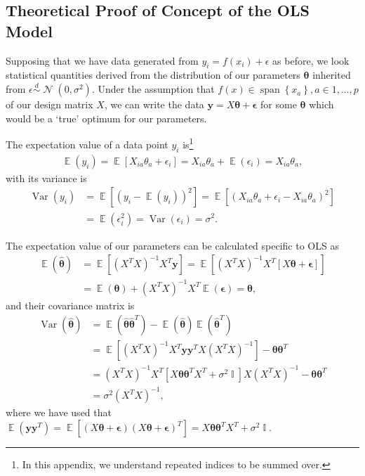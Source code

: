 \documentclass[twocolumn,english,notitlepage]{article}
\renewcommand{\vec}[1]{\boldsymbol{#1}}
\newcommand{\pclosed}[1]{\left(#1\right)}
\newcommand{\bclosed}[1]{\left[#1\right]}
\newcommand{\cclosed}[1]{\left\{#1\right\}}
\newcommand{\normal}[2]{\operatorname{\mathcal{N}}\pclosed{#1,#2}}
\newcommand{\distas}{\overset{d}{\sim}}
\renewcommand{\expval}{\operatorname{\mathbb{E}}}
\renewcommand{\var}{\operatorname{Var}}
\DeclareMathOperator{\eye}{\mathbb{I}}
\newcommand{\thetahat}{\hat{\theta}}
\begin{document}
\begin{appendices}
    \section{Theoretical Proof of Concept of the OLS Model} \label{app:sec:OLS_proof}
        Supposing that we have data generated from $y_i = f(x_i)+\epsilon$ as before, we look statistical quantities derived from the distribution of our parameters $\vec{\theta}$ inherited from $\epsilon\distas \normal{0}{\sigma^2}$. Under the assumption that $f(x) \in \operatorname{span}\cclosed{x_a}, a\in 1,\ldots,p$ of our design matrix $X$, we can write the data $\vec{y} = X\vec{\theta} + \vec{\epsilon}$ for some $\vec{\theta}$ which would be a `true' optimum for our parameters.

        The expectation value of a data point $y_i$ is\footnote{In this appendix, we understand repeated indices to be summed over.}
        \begin{align}
            \expval(y_i) = \expval\bclosed{X_{ia} \theta_a + \epsilon_i} = X_{ia}\theta_a + \expval(\epsilon_i) = X_{ia}\theta_a,
        \end{align}
        with its variance is
        \begin{align} \nonumber
            \var(y_i) &= \expval\bclosed{\pclosed{y_i-\expval\pclosed{y_i}}^2} = \expval\bclosed{\pclosed{X_{ia}\theta_a + \epsilon_i - X_{ia}\theta_a}^2} \\
            &= \expval\pclosed{\epsilon_i^2} = \var\pclosed{\epsilon_i} = \sigma^2.
        \end{align}

        The expectation value of our parameters can be calculated specific to OLS as
        \begin{align} \nonumber
            \expval(\vec{\thetahat}) &= \expval\bclosed{(X^TX)^{-1}X^T \vec{y}} = \expval\bclosed{(X^TX)^{-1}X^T \bclosed{X\vec{\theta} + \vec{\epsilon}} } \\
            &= \expval\pclosed{\vec{\theta}} + {(X^TX)}^{-1}X^T \expval\pclosed{\vec{\epsilon}} = \vec{\theta},
        \end{align}
        and their covariance matrix is
        \begin{align} \nonumber
            \var(\vec{\thetahat}) &= \expval({\vec{\thetahat} \vec{\thetahat}^T}) - \expval({\vec{\thetahat}}) \expval({\vec{\thetahat}^T}) \\ \nonumber
            &= \expval\bclosed{(X^TX)^{-1}X^T \vec{y} \vec{y}^T X (X^TX)^{-1}} - \vec{\theta}\vec{\theta}^T \\ \nonumber
            &= (X^TX)^{-1}X^T \bclosed{X\vec{\theta}\vec{\theta}^TX^T + \sigma^2 \eye}X (X^TX)^{-1} - \vec{\theta}\vec{\theta}^T \\
            &= \sigma^2 (X^TX)^{-1},
        \end{align}
        where we have used that \(\expval(\vec{y}\vec{y}^T) = \expval\bclosed{(X\vec{\theta}+\vec{\epsilon})(X\vec{\theta}+\vec{\epsilon})^T} = X\vec{\theta}\vec{\theta}^TX^T + \sigma^2 \eye\).



\end{appendices}
\end{document}

